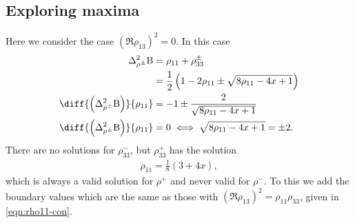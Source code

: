 \begin{subappendices}
\subsection{Exploring maxima}
Here we consider the case $\left(\Re{\rho_{13}}\right)^2 = 0$. In this case
\begin{align}
  \var[\rho^\pm]{\opb} &= \rho_{11} + \rho_{33}^\pm\\
                       &= \frac{1}{2} \left(1-2 \rho_{11}\pm\sqrt{8 \rho_{11}-4 x+1}\right)\\
  \diff{\left(\var[\rho^\pm]{\opb}\right)}{\rho_{11}} &= -1 \pm \frac{2}{\sqrt{8\rho_{11} -4x+1}}\\
  \diff{\left(\var[\rho^\pm]{\opb}\right)}{\rho_{11}} &= 0 \iff \sqrt{8\rho_{11} -4x+1} = \pm 2.
                                                        \label{eqn:deriv-y-rhomax-is-zero}
\end{align}
There are no solutions for $\rho_{33}^-$, but $\rho_{33}^+$ has the solution
\begin{align}
  \label{eqn:rho-plus-max-zero-deriv-solns}
  \rho_{11} = \frac{1}{8}\left(3+4x\right),
\end{align}
which is always a valid solution for $\rho^+$ and never valid for $\rho^-$. To this we add the boundary values which are the same as those with $\left(\Re{\rho_{13}}\right)^2 = \rho_{11}\rho_{33}$, given in \eqref{eqn:rho11-con}.


\end{subappendices}
